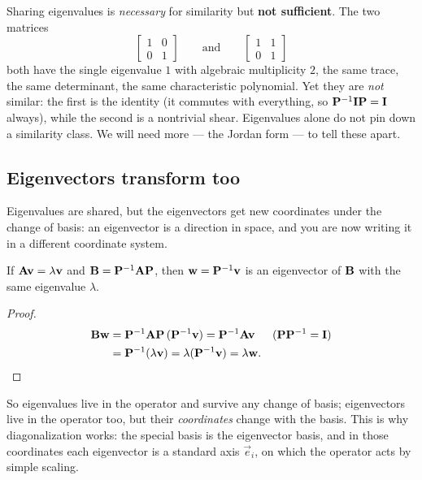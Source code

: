 \begin{trapbox}
Sharing eigenvalues is \emph{necessary} for similarity but \textbf{not sufficient}. The
two matrices
\[
\begin{bmatrix}1&0\\0&1\end{bmatrix}
\qquad\text{and}\qquad
\begin{bmatrix}1&1\\0&1\end{bmatrix}
\]
both have the single eigenvalue $1$ with algebraic multiplicity $2$, the same trace, the
same determinant, the same characteristic polynomial. Yet they are \emph{not} similar:
the first is the identity (it commutes with everything, so
$\mathbf{P}^{-1}\mathbf{I}\mathbf{P}=\mathbf{I}$ always), while the second is a nontrivial shear.
Eigenvalues alone do not pin down a similarity class. We will need more --- the Jordan
form --- to tell these apart.
\end{trapbox}

\subsection{Eigenvectors transform too}

Eigenvalues are shared, but the eigenvectors get new coordinates under the change of
basis: an eigenvector is a direction in space, and you are now writing it in a different
coordinate system.

\begin{proposition}
\label{ch28:eigvec-transform}
If $\mathbf{A}\mathbf{v}=\lambda\mathbf{v}$ and $\mathbf{B}=\mathbf{P}^{-1}\mathbf{A}\mathbf{P}$, then
$\mathbf{w}=\mathbf{P}^{-1}\mathbf{v}$ is an eigenvector of $\mathbf{B}$ with the same eigenvalue
$\lambda$.
\end{proposition}

\begin{proof}
\begin{align*}
\mathbf{B}\mathbf{w}&=\mathbf{P}^{-1}\mathbf{A}\mathbf{P}\,(\mathbf{P}^{-1}\mathbf{v})
=\mathbf{P}^{-1}\mathbf{A}\mathbf{v} && (\mathbf{P}\mathbf{P}^{-1}=\mathbf{I})\\
&=\mathbf{P}^{-1}(\lambda\mathbf{v})=\lambda(\mathbf{P}^{-1}\mathbf{v})=\lambda\mathbf{w}.
\end{align*}
\end{proof}

So eigenvalues live in the operator and survive any change of basis; eigenvectors live
in the operator too, but their \emph{coordinates} change with the basis. This is
why diagonalization works: the special basis is the eigenvector basis, and in those
coordinates each eigenvector is a standard axis $\vec{e}_i$, on which the operator acts
by simple scaling.

